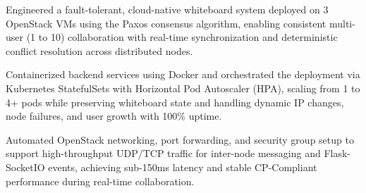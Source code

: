 \vspace{4pt}
\begin{tightemize}
    \item Engineered a fault-tolerant, cloud-native whiteboard system deployed on 3 OpenStack VMs using the Paxos consensus algorithm, enabling consistent multi-user (1 to 10) collaboration with real-time synchronization and deterministic conflict resolution across distributed nodes.
    \item Containerized backend services using Docker and orchestrated the deployment via Kubernetes StatefulSets with Horizontal Pod Autoscaler (HPA), scaling from 1 to 4+ pods while preserving whiteboard state and handling dynamic IP changes, node failures, and user growth with 100\% uptime.
    \item Automated OpenStack networking, port forwarding, and security group setup to support high-throughput UDP/TCP traffic for inter-node messaging and Flask-SocketIO events, achieving sub-150ms latency and stable CP-Compliant performance during real-time collaboration.
\end{tightemize}
